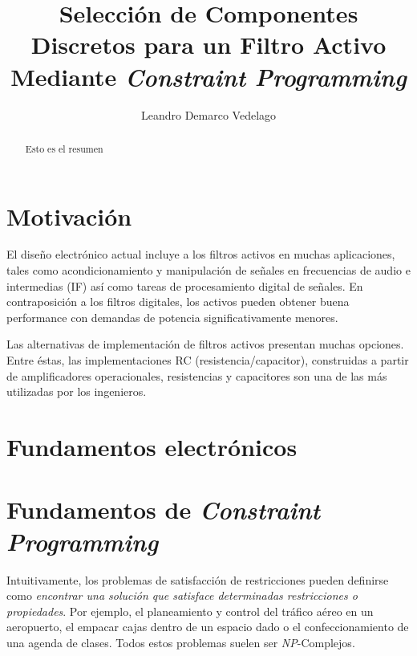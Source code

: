 \documentclass{llncs}
\title{Selecci\'on de Componentes Discretos para un Filtro Activo Mediante \textit{Constraint Programming}}
\author{Leandro Demarco Vedelago}
\institute{
            \email{leandrodemarco@gmail.com}\\
            Universidad Nacional de C\'ordoba, Fa.M.A.F
          }
\begin{document}
{\def\addcontentsline#1#2#3{}\maketitle
  \noindent
  }
  
\begin{abstract}
  Esto es el resumen 
\end{abstract}

\tableofcontents
\newpage
  \section{\textbf{Motivaci\'on}}
    \label{sec:motivacion}
    El dise\~no electr\'onico actual incluye a los filtros activos en muchas aplicaciones,
    tales como acondicionamiento y manipulaci\'on de se\~nales en frecuencias de audio e
    intermedias (IF) as\'i como tareas de procesamiento digital de se\~nales. En
    contraposici\'on a los filtros digitales, los activos pueden obtener buena performance
    con demandas de potencia significativamente menores.
    
    Las alternativas de implementaci\'on de filtros activos presentan muchas opciones.
    Entre \'estas, las implementaciones RC (resistencia/capacitor), construidas a partir de
    amplificadores operacionales, resistencias y capacitores son una de las m\'as utilizadas
    por los ingenieros.\cite{corr}
    
  \section{\textbf{Fundamentos electr\'onicos}}
    \label{sec:fundelect}
    
  \section{\textbf{Fundamentos de \textit{Constraint Programming}}}
    \label{sec:fundprog}
    Intuitivamente, los problemas de satisfacci\'on de restricciones pueden definirse como \textit{encontrar
    una soluci\'on que satisface determinadas restricciones o pro\-pie\-da\-des}.
    Por ejemplo, el planeamiento y control del tr\'afico a\'ereo en un aeropuerto, el empacar cajas dentro de un
    espacio dado o el confeccionamiento de una agenda de clases. 
    Todos estos problemas suelen ser \textit{NP}-Complejos.
    
\end{document}
